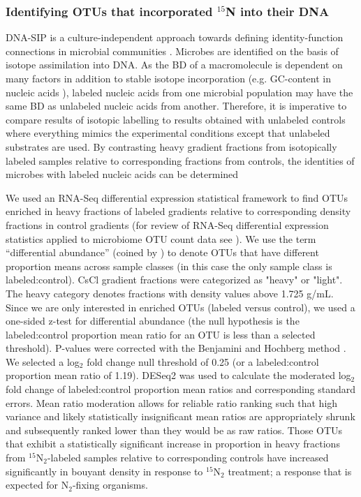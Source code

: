 \subsubsection{Identifying OTUs that incorporated $^{15}$N into their DNA}
DNA-SIP is a culture-independent approach towards defining identity-function
connections in microbial communities \citep{Buckley_2011, 17446886,
Radajewski_2001}. Microbes are identified on the basis of
isotope assimilation into DNA. As the BD of a macromolecule is dependent on many factors in addition to stable isotope incorporation (e.g. GC-content in nucleic acids \citep{25139123}),
labeled nucleic acids from one microbial population may have the same BD as unlabeled nucleic acids from another. Therefore, it is imperative to compare results of isotopic labelling to results obtained with unlabeled controls where everything mimics the experimental conditions except that unlabeled substrates are used. By contrasting heavy gradient fractions from isotopically labeled samples relative to corresponding fractions from controls, the identities of microbes with labeled nucleic acids can be
determined 

We used an RNA-Seq differential expression statistical framework
\citep{Love_2014} to find OTUs enriched in heavy fractions of labeled
gradients relative to corresponding density fractions in control gradients
(for review of RNA-Seq differential expression statistics applied to
microbiome OTU count data see \citet{24699258}). We use the term
“differential abundance” (coined by \citet{24699258}) to denote OTUs that
have different proportion means across sample classes (in this case the only
sample class is labeled:control).  CsCl gradient fractions were categorized
as "heavy" or "light". The heavy category denotes fractions with density
values above 1.725 g/mL. Since we are only interested in enriched OTUs
(labeled versus control), we used a one-sided z-test for differential
abundance (the null hypothesis is the labeled:control proportion mean ratio
for an OTU is less than a selected threshold). P-values were corrected with
the Benjamini and Hochberg method \citep{citeulike:1042553}. We selected a
log$_{2}$ fold change null threshold of 0.25 (or a labeled:control proportion
mean ratio of 1.19). DESeq2 was used to calculate the moderated log$_{2}$
fold change of labeled:control proportion mean ratios and corresponding
standard errors. Mean ratio moderation allows for reliable ratio ranking such
that high variance and likely statistically insignificant mean ratios are
appropriately shrunk and subsequently ranked lower than they would be as raw
ratios. Those OTUs that exhibit a statistically significant increase in
proportion in heavy fractions from $^{15}$N$_{2}$-labeled samples relative to
corresponding controls have increased significantly in bouyant density in
response to $^{15}$N$_{2}$ treatment; a response that is expected for
N$_{2}$-fixing organisms.

